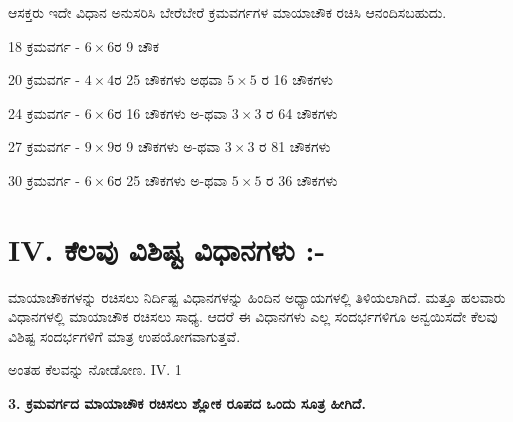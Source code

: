\begin{itemize}
	ಆಸಕ್ತರು ಇದೇ ವಿಧಾನ ಅನುಸರಿಸಿ ಬೇರೆಬೇರೆ ಕ್ರಮವರ್ಗಗಳ ಮಾಯಾಚೌಕ ರಚಿಸಿ ಆನಂದಿಸಬಹುದು.

	18 ಕ್ರಮವರ್ಗ - $6 \times 6$ರ 9 ಚೌಕ

	20 ಕ್ರಮವರ್ಗ - $4 \times 4$ರ 25 ಚೌಕಗಳು ಅಥವಾ $5 \times 5$ ರ 16 ಚೌಕಗಳು

	24 ಕ್ರಮವರ್ಗ - $6 \times 6$ರ 16 ಚೌಕಗಳು ಅ-ಥವಾ $3 \times 3$ ರ 64 ಚೌಕಗಳು

	27 ಕ್ರಮವರ್ಗ - $9 \times 9$ರ 9 ಚೌಕಗಳು ಅ-ಥವಾ $3 \times 3$ ರ 81 ಚೌಕಗಳು

	30 ಕ್ರಮವರ್ಗ - $6 \times 6$ರ 25 ಚೌಕಗಳು ಅ-ಥವಾ $5 \times 5$ ರ 36 ಚೌಕಗಳು
\end{itemize}
\section{IV. ಕೆಲವು ವಿಶಿಷ್ಟ ವಿಧಾನಗಳು :-}

ಮಾಯಾಚೌಕಗಳನ್ನು ರಚಿಸಲು ನಿರ್ದಿಷ್ಟ ವಿಧಾನಗಳನ್ನು ಹಿಂದಿನ ಅಧ್ಯಾಯಗಳಲ್ಲಿ ತಿಳಿಯಲಾಗಿದೆ. ಮತ್ತೂ ಹಲವಾರು ವಿಧಾನಗಳಲ್ಲಿ ಮಾಯಾಚೌಕ ರಚಿಸಲು ಸಾಧ್ಯ. ಆದರೆ ಈ ವಿಧಾನಗಳು ಎಲ್ಲ ಸಂದರ್ಭಗಳಿಗೂ ಅನ್ವಯಿಸದೇ ಕೆಲವು ವಿಶಿಷ್ಟ ಸಂದರ್ಭಗಳಿಗೆ ಮಾತ್ರ ಉಪಯೋಗವಾಗುತ್ತವೆ.

ಅಂತಹ ಕೆಲವನ್ನು ನೋಡೋಣ. IV. 1

\textbf{3. ಕ್ರಮವರ್ಗದ ಮಾಯಾಚೌಕ ರಚಿಸಲು ಶ್ಲೋಕ ರೂಪದ ಒಂದು ಸೂತ್ರ ಹೀಗಿದೆ.}

